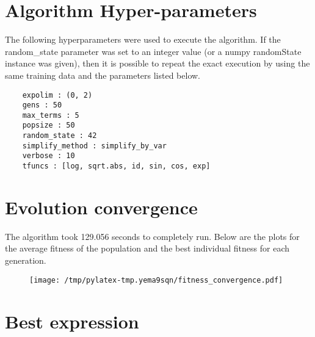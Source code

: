 \documentclass{article}%
\begin{document}
%
\vfill \pagebreak

%
\section*{Algorithm Hyper-parameters}%
\label{sec:AlgorithmHyper{-}parameters}%

                The following hyperparameters were used to execute the
                algorithm. If the random\_state parameter was set to an 
                integer value (or a numpy randomState instance was given), then
                it is possible to repeat the exact execution by using the same
                training data and the parameters listed below.%
{\footnotesize \begin{verbatim}    expolim : (0, 2)
    gens : 50
    max_terms : 5
    popsize : 50
    random_state : 42
    simplify_method : simplify_by_var
    verbose : 10
    tfuncs : [log, sqrt.abs, id, sin, cos, exp]\end{verbatim} } \vfill \pagebreak

%

            \chead{}
            \rhead{\today, \currenttime}
            
            \lfoot{}
            \cfoot{}
            \rfoot{\thepage\ | \pageref{LastPage}}
\section*{Evolution convergence}%
\label{sec:Evolutionconvergence}%

                The algorithm took 129.056 seconds to
                completely run. Below are the plots for the average fitness
                of the population and the best individual fitness for each
                generation.\vfill%


\begin{figure}[H]%
\centering%
\texttt{[image: /tmp/pylatex-tmp.yema9sqn/fitness\_convergence.pdf]}%
\end{figure}

%
\vfill \pagebreak

%
\section*{Best expression}%
\label{sec:Bestexpression}%
\end{document}

